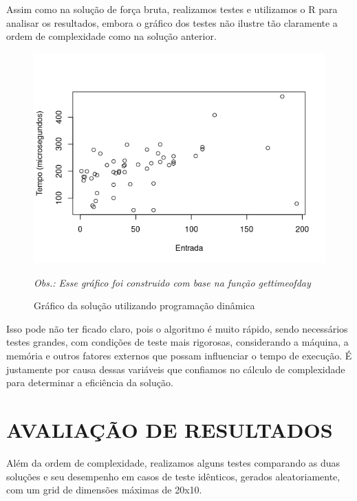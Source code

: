 \documentclass[12pt]{article}
\begin{document}
                Assim como na solução de força bruta, realizamos testes e utilizamos o R para analisar 
                os resultados, embora o gráfico dos testes não ilustre tão claramente a ordem de 
                complexidade como na solução anterior.

                \begin{figure}[h]
                    \centering
                    \includegraphics[width=0.9\linewidth]{Figuras/graficoPD1.png}\\
                    \caption{Gráfico da solução utilizando programação dinâmica}
                    \label{fig:grafico programacao dinamica }
                    \textit{Obs.: Esse gráfico foi construido com base na função gettimeofday}
                \end{figure}

                Isso pode não ter ficado claro, pois o algoritmo é muito rápido, sendo necessários testes
                grandes, com condições de teste mais rigorosas, considerando a máquina, a memória e outros 
                fatores externos que possam influenciar o tempo de execução. É justamente por causa dessas 
                variáveis que confiamos no cálculo de complexidade para determinar a eficiência da solução.


    \newpage
    \section{AVALIAÇÃO DE RESULTADOS}
        Além da ordem de complexidade, realizamos alguns testes comparando as duas soluções e seu desempenho 
        em casos de teste idênticos, gerados aleatoriamente, com um grid de dimensões máximas de 20x10.
\end{document}
